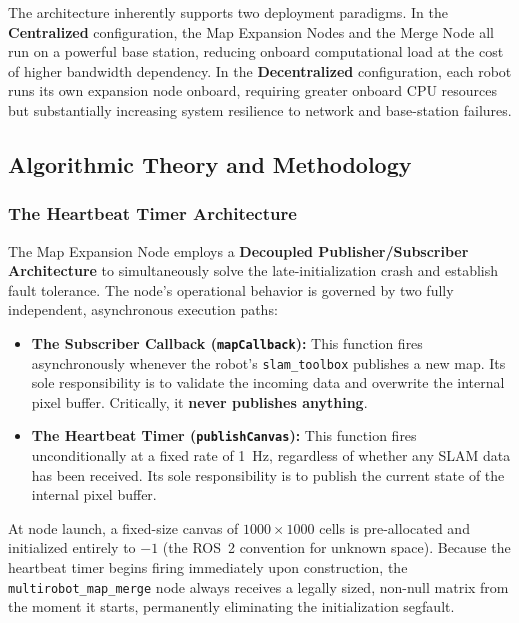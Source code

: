 \documentclass{article}
\begin{document}
The architecture inherently supports two deployment paradigms. In the \textbf{Centralized} configuration, the Map Expansion Nodes and the Merge Node all run on a powerful base station, reducing onboard computational load at the cost of higher bandwidth dependency. In the \textbf{Decentralized} configuration, each robot runs its own expansion node onboard, requiring greater onboard CPU resources but substantially increasing system resilience to network and base-station failures.

\subsection{Algorithmic Theory and Methodology}
\label{subsec:map_merge_algorithm}

\subsubsection{The Heartbeat Timer Architecture}
\label{subsubsec:heartbeat}

The Map Expansion Node employs a \textbf{Decoupled Publisher/Subscriber Architecture} to simultaneously solve the late-initialization crash and establish fault tolerance. The node's operational behavior is governed by two fully independent, asynchronous execution paths:

\begin{itemize}
    \item \textbf{The Subscriber Callback (\texttt{mapCallback}):} This function fires asynchronously whenever the robot's \texttt{slam\_toolbox} publishes a new map. Its sole responsibility is to validate the incoming data and overwrite the internal pixel buffer. Critically, it \textbf{never publishes anything}.

    \item \textbf{The Heartbeat Timer (\texttt{publishCanvas}):} This function fires unconditionally at a fixed rate of 1~Hz, regardless of whether any SLAM data has been received. Its sole responsibility is to publish the current state of the internal pixel buffer.
\end{itemize}

At node launch, a fixed-size canvas of $1000 \times 1000$ cells is pre-allocated and initialized entirely to $-1$ (the ROS~2 convention for unknown space). Because the heartbeat timer begins firing immediately upon construction, the \texttt{multirobot\_map\_merge} node always receives a legally sized, non-null matrix from the moment it starts, permanently eliminating the initialization segfault.
\end{document}
